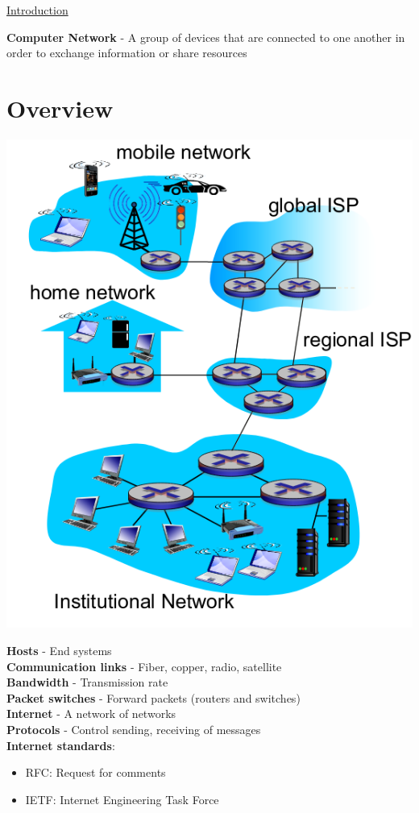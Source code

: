 \documentclass{article}[18pt]
\begin{document}
\begin{center}
\underline{\huge Introduction}
\end{center}
\textbf{Computer Network} - A group of devices that are connected to one another in order to exchange information or share resources
\section{Overview}
\begin{center}
	\includegraphics[scale=0.7]{Overview}
\end{center}
\textbf{Hosts} - End systems\\
\textbf{Communication links} - Fiber, copper, radio, satellite\\
\textbf{Bandwidth} - Transmission rate\\
\textbf{Packet switches} - Forward packets (routers and switches)\\
\textbf{Internet} - A network of networks\\
\textbf{Protocols} - Control sending, receiving of messages\\
\textbf{Internet standards}:
\begin{itemize}
	\item RFC: Request for comments
	\item IETF: Internet Engineering Task Force
\end{itemize}
\end{document}
